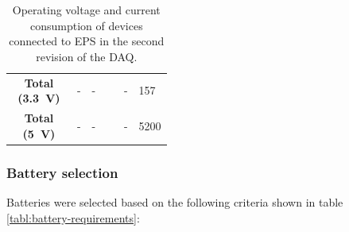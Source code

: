 \documentclass[draft]{report}
\begin{document}
\begin{table}[H]
\begin{tabular}{|c|c|L{0.2\linewidth}|c|L{0.2\linewidth}|}
    \hline
    \textbf{Total (\SI{3.3}{\volt})} & -                             & -                                              & -                 & 157                                       \\
    \textbf{Total (\SI{5}{\volt})}   & -                             & -                                              & -                 & 5200                                      \\
    \hline
  \end{tabular}
  \caption{Operating voltage and current consumption of devices connected to EPS in the second revision of the DAQ.}
  \label{tabl:eps-power-budget}
\end{table}

\subsubsection{Battery selection}

Batteries were selected based on the following criteria shown in table \ref{tabl:battery-requirements}:
\end{document}
